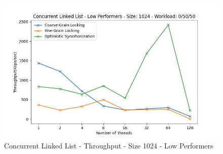 \documentclass[../final_report.tex]{subfiles}
\begin{document}
\begin{figure}[H]
        \includegraphics[scale=0.4]{outFiles/plots/concurrent_data_structs_low_1024_0_50_50.jpg}
    \caption{Concurrent Linked List - Throughput - Size 1024 - Low Performers}
    \label{fig:Concurrent Linked List - Throughput - Size 1024 - Low Performers}
\end{figure}
\end{document}
